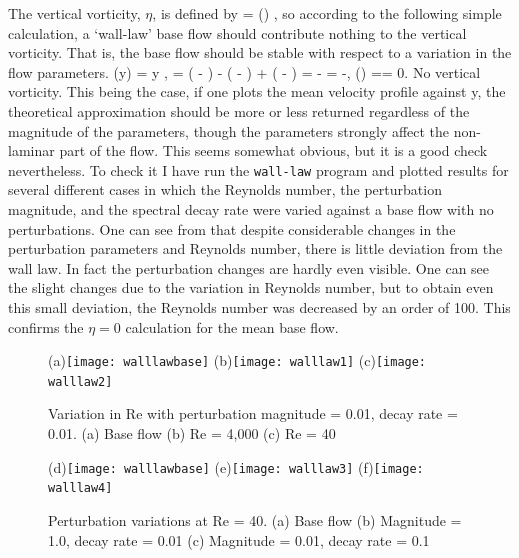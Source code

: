 \documentclass[pre,twocolumn,groupedaddress]{revtex4}
\begin{document}
{ The vertical vorticity, $\eta$, is defined by
\beq \eta = (\nabla \times {}) \cdot {}, \eeq
  so according to
 the following simple calculation, a `wall-law' base flow should contribute
 nothing to the vertical vorticity. That is,
the base flow should be  stable with respect to a variation in the
flow parameters.
  \beq {}(y) = y , \eeq
    \beq \nabla \times {} = ( - ) - ( - ) + ( - ) \nonumber \eeq
 \beq = -   = -, \nonumber \eeq
 \beq (\nabla \times {}) \cdot {} =\eta = 0. \eeq No vertical vorticity.
  This being the case, if one plots the mean velocity profile against y,
the theoretical approximation should be more or less returned
regardless of the
 magnitude of the parameters, though the parameters strongly affect the non-laminar
 part of the flow. This seems somewhat obvious, but it is a good check
 nevertheless. To check it I have run the {\tt wall-law} program and plotted
 results for several different cases in which the Reynolds number, the
 perturbation magnitude, and the spectral decay rate were varied against a base
 flow with no perturbations.
One can see from  that
despite considerable changes in the perturbation parameters and
Reynolds number, there is little deviation from the wall law. In
fact the perturbation changes are hardly even visible. One can see
the slight changes due to the variation in Reynolds number, but to
obtain even this small deviation, the Reynolds number was decreased
by an order of 100. This confirms the $\eta = 0$ calculation for the
mean base flow.


\begin{figure}[htbp]
(a)\texttt{[image: walllawbase]}
(b)\texttt{[image: walllaw1]}
 (c)\texttt{[image: walllaw2]}
  \caption{Variation in Re with perturbation magnitude = 0.01, decay rate = 0.01.
  (a) {Base flow}  (b) { Re = 4,000} (c) { Re = 40}}
  \label{eltonFig:perturb1}
 \end{figure}


\begin{figure}[htbp]
 (d)\texttt{[image: walllawbase]}
 (e)\texttt{[image: walllaw3]}
 (f)\texttt{[image: walllaw4]}
  \caption{Perturbation variations at Re = 40. (a) {Base flow}  (b) {Magnitude = 1.0,
  decay rate = 0.01} (c) {Magnitude = 0.01,
 decay rate = 0.1}}
 \label{eltonFig:perturb2}
 \end{figure}



}
\end{document}

